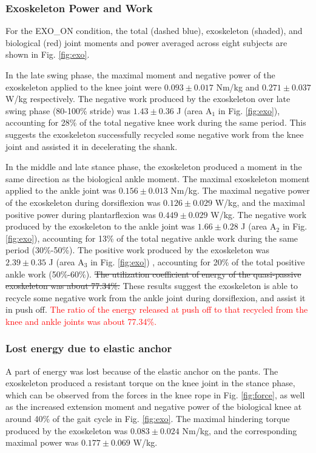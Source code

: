 \documentclass[twocolumn,cleanfoot,10pt]{asme2ej}
\begin{document}
\subsubsection{Exoskeleton Power and Work}
For the EXO\_ON condition, the total (dashed blue), exoskeleton (shaded), and biological (red) joint moments and power averaged across eight subjects are shown in Fig. \ref{fig:exo}.

In the late swing phase, the maximal moment and negative power of the exoskeleton applied to the knee joint were $0.093\pm0.017$ Nm/kg and $0.271\pm0.037$ W/kg respectively.
The negative work produced by the exoskeleton over late swing phase (80-100\% stride) was $1.43\pm0.36$ J (area A$_{1}$ in Fig. \ref{fig:exo}), accounting for 28\% of the total negative knee work during the same period.
This suggests the exoskeleton successfully recycled some negative work from the knee joint and assisted it in decelerating the shank.

In the middle and late stance phase, the exoskeleton produced a moment in the same direction as the biological ankle moment.
The maximal exoskeleton moment applied to the ankle joint was $0.156\pm0.013$ Nm/kg.
The maximal negative power of the exoskeleton during dorsiflexion was $0.126\pm0.029$ W/kg, and the maximal positive power during plantarflexion was $0.449\pm0.029$ W/kg.
The negative work produced by the exoskeleton to the ankle joint was $1.66\pm0.28$ J (area A$_{2}$ in Fig. \ref{fig:exo}), accounting for 13\% of the total negative ankle work during the same period (30\%-50\%).
The positive work produced by the exoskeleton was $2.39\pm0.35$ J (area A$_{3}$ in Fig. \ref{fig:exo}) , accounting for 20\% of the total positive ankle work (50\%-60\%).
\sout{The utilization coefficient of energy of the quasi-passive exoskeleton was about 77.34\%.}
These results suggest the exoskeleton is able to recycle some negative work from the ankle joint during dorsiflexion, and assist it in push off.
\textcolor{red}{The ratio of the energy released at push off to that recycled from the knee and ankle joints was about 77.34\%.}

\subsubsection{Lost energy due to elastic anchor}
A part of energy was lost because of the elastic anchor on the pants.
The exoskeleton produced a resistant torque on the knee joint in the stance phase, which can be observed from the forces in the knee rope in Fig. \ref{fig:force}, as well as the increased extension moment and negative power of the biological knee at around 40\% of the gait cycle in Fig. \ref{fig:exo}. 
The maximal hindering torque produced by the exoskeleton was $0.083\pm0.024$ Nm/kg, and the corresponding maximal power was $0.177\pm0.069$ W/kg.
\end{document}
